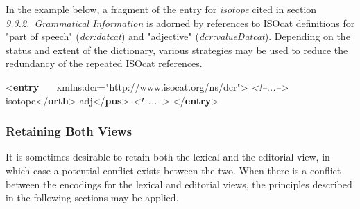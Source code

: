 In the example below, a fragment of the entry for \textit{isotope} cited in section \textit{\hyperref[DITPGR]{9.3.2.\ Grammatical Information}} is adorned by references to ISOcat definitions for "part of speech" ({\itshape dcr:datcat}) and "adjective" ({\itshape dcr:valueDatcat}). Depending on the status and extent of the dictionary, various strategies may be used to reduce the redundancy of the repeated ISOcat references.\par\bgroup{}\exampleFont \begin{shaded}\noindent\mbox{}{<\textbf{entry}\mbox{}\newline 
   xmlns:dcr="http://www.isocat.org/ns/dcr">}\mbox{}\newline 
\textit{<!--...-->}\mbox{}\newline 
{}\mbox{}\newline 
\hspace*{1em}isotope{</\textbf{orth}>}\mbox{}\newline 
{}\mbox{}\newline 
{}\mbox{}\newline 
\hspace*{1em}adj{</\textbf{pos}>}\mbox{}\newline 
{}\mbox{}\newline 
\textit{<!--...-->}\mbox{}\newline 
{</\textbf{entry}>}\end{shaded}\egroup\par 
\subsubsection[{Retaining Both Views}]{Retaining Both Views}\label{DIMVBO}\par
It is sometimes desirable to retain both the lexical and the editorial view, in which case a potential conflict exists between the two. When there is a conflict between the encodings for the lexical and editorial views, the principles described in the following sections may be applied. 
